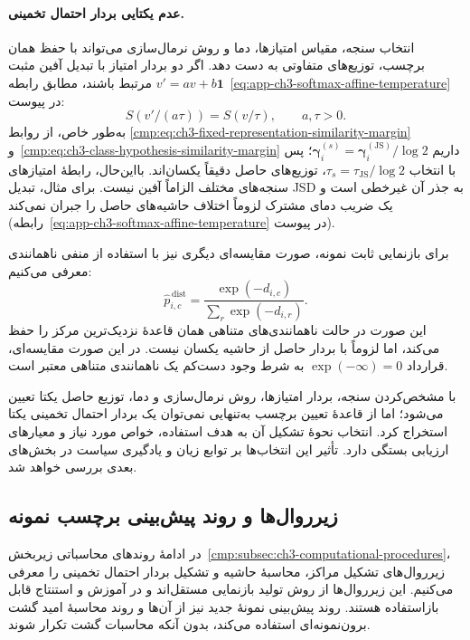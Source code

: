 \paragraph{عدم یکتایی بردار احتمال تخمینی.}
انتخاب سنجه، مقیاس امتیازها، دما و روش نرمال‌سازی
می‌تواند با حفظ همان برچسب، توزیع‌های متفاوتی
به دست دهد. اگر دو بردار امتیاز با تبدیل آفین مثبت
$v'=av+b\mathbf1$ مرتبط باشند، مطابق
رابطه~\eqref{eq:app-ch3-softmax-affine-temperature} در پیوست:
\begin{equation}\label{cmp:eq:ch3-margin-affine-temperature}
S(v'/(a\tau))=S(v/\tau),\qquad a,\tau>0.
\end{equation}
به‌طور خاص، از روابط
\eqref{cmp:eq:ch3-fixed-representation-similarity-margin}
و~\eqref{cmp:eq:ch3-class-hypothesis-similarity-margin}
داریم
$\boldsymbol\gamma_i^{(s)}=
\boldsymbol\gamma_i^{(\mathrm{JS})}/\log2$؛ پس با
انتخاب $\tau_s=\tau_{\mathrm{JS}}/\log2$، توزیع‌های
حاصل دقیقاً یکسان‌اند. بااین‌حال، رابطهٔ امتیازهای
سنجه‌های مختلف الزاماً آفین نیست. برای مثال، تبدیل
JSD به جذر آن غیرخطی است و یک ضریب دمای مشترک
لزوماً اختلاف حاشیه‌های حاصل را جبران نمی‌کند
(رابطه~\eqref{eq:app-ch3-softmax-affine-temperature} در پیوست).

برای بازنمایی ثابت نمونه، صورت مقایسه‌ای دیگری
نیز با استفاده از منفی ناهمانندی معرفی می‌کنیم:
\begin{equation}\label{cmp:eq:ch3-NLL-softmax}
\widehat p_{i,c}^{\,\mathrm{dist}}
=\frac{\exp(-d_{i,c})}{\sum_r\exp(-d_{i,r})}.
\end{equation}
این صورت در حالت ناهمانندی‌های متناهی همان
قاعدهٔ نزدیک‌ترین مرکز را حفظ می‌کند، اما لزوماً
با بردار حاصل از حاشیه یکسان نیست. در این صورت
مقایسه‌ای، قرارداد $\exp(-\infty)=0$ به شرط وجود
دست‌کم یک ناهمانندی متناهی معتبر است.

با مشخص‌کردن سنجه، بردار امتیازها، روش نرمال‌سازی
و دما، توزیع حاصل یکتا تعیین می‌شود؛ اما از قاعدهٔ
تعیین برچسب به‌تنهایی نمی‌توان یک بردار احتمال
تخمینی یکتا استخراج کرد. انتخاب نحوهٔ تشکیل آن
به هدف استفاده، خواص مورد نیاز و معیارهای ارزیابی
بستگی دارد. تأثیر این انتخاب‌ها بر توابع زیان
و یادگیری سیاست در بخش‌های بعدی بررسی خواهد شد.

\subsection{زیرروال‌ها و روند پیش‌بینی برچسب نمونه}
\label{cmp:subsec:ch3-prediction-procedures}
در ادامهٔ روندهای محاسباتی
زیربخش~\ref{cmp:subsec:ch3-computational-procedures}،
زیرروال‌های تشکیل مراکز، محاسبهٔ حاشیه و تشکیل بردار
احتمال تخمینی را معرفی می‌کنیم. این زیرروال‌ها از
روش تولید بازنمایی مستقل‌اند و در آموزش و استنتاج
قابل بازاستفاده هستند. روند پیش‌بینی نمونهٔ جدید
نیز از آن‌ها و روند محاسبهٔ امید گشت برون‌نمونه‌ای
استفاده می‌کند، بدون آنکه محاسبات گشت تکرار شوند.

